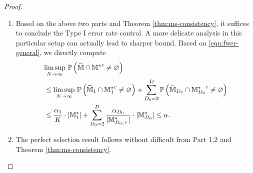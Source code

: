 \documentclass[12pt]{article}
\begin{document}
\begin{proof}
\begin{enumerate}
\begin{align}
        &\underset{N\to\infty}{\lim\sup}~\bbP\lt\{\tilde{\bbM}^c_{d}\cap\bbM^{\star }_k\neq \varnothing\rt\} \notag\\
        &\le \underset{N\to\infty}{\lim\sup}~ \sum_{\cK\in\bbM^{\star }_{d}} \bbP\lt\{-\Phi^{-1}\lt(1-\frac{\alpha_d}{2|\bbM^{\star }_{d,+}|} \rt) - \frac{\tau_\cK}{\sigma_\cK}\le\frac{\htau_{\cK}}{\hat{\sigma}_\cK} - \frac{\tau_\cK}{\sigma_\cK}\le\Phi^{-1}\lt(1-\frac{\alpha_d}{2|\bbM^{\star }_{d,+}|} \rt) - \frac{\tau_\cK}{\sigma_\cK}\rt\}\notag\\
        & = \underset{N\to\infty}{\lim\sup}~\sum_{\cK\in\bbM_d^\star} \Phi\lt\{r_\cK^{-1}\lt(Z_d^\star - \frac{\tau_\cK}{\sigma_\cK}\rt)\rt\} - \Phi\lt\{r_\cK^{-1}\lt(-Z_d^\star - \frac{\tau_\cK}{\sigma_\cK}\rt)\rt\}.%
    \end{align}
    
     Note that when $\alpha_d\to 0, N\to\infty$, we have
    \begin{align*}
        Z_d^\star =  \Theta\lt(\sqrt{2\ln\frac{2|\bbM_{d,+}^\star|}{\alpha_d}}\rt) =  \Theta(\max\{\delta'\ln N,\ln(2|\bbM^\star_{d,+}|)\}),~ \lt|\frac{\tau_\cK}{\sigma_\cK}\rt| =  \Theta(N^{1/2+\delta}).
    \end{align*}
    Since $\delta>-1/2$ and $\delta'\ge 0$, we have $|\frac{\tau_\cK}{\sigma_\cK}| \to \infty$ and $Z_d^\star/(|\frac{\tau_\cK}{\sigma_\cK}|) \to 0$. Hence the above limit \eqref{eqn:typeII-limit} converges to zero. This concludes the proof.
    
    \item Based on the above two parts and Theorem \ref{thm:ms-consistency}, it suffices to conclude the Type I error rate control. A more delicate analysis in this particular setup can actually lead to sharper bound. Based on \eqref{eqn:fwer-general}, we directly compute
    \begin{align*}
    &\underset{N \to\infty}{\lim\sup}~{\mathbb{P}}\left(\widehat{{\mathbb{M}}}\cap{{\mathbb{M}}^\star}^c\neq \varnothing\right) \\
    &\le\underset{N \to\infty}{\lim\sup}~{\mathbb{P}}\left(\widehat{{\mathbb{M}}}_1\cap{{\mathbb{M}}_1^\star}^c\neq\varnothing\right) + \sum_{D_0=2}^D {\mathbb{P}}\left(  \widetilde{{\mathbb{M}}}_{D_0}\cap{{\mathbb{M}}_{D_0}^\star}^c\neq\varnothing\right)\\
    &\le 
    \frac{\alpha_1}{K}\cdot|{\mathbb{M}}_1^\star| + \sum_{D_0=2}^D \frac{\alpha_{D_0}}{|{\mathbb{M}}^\star_{D_0,+}|}\cdot|{\mathbb{M}}^\star_{D_0}| \le \alpha. 
    \end{align*}
    
    \item The perfect selection result follows without difficult from Part 1,2 and Theorem \ref{thm:ms-consistency}.

\end{enumerate}
 
\end{proof}
\end{document}
